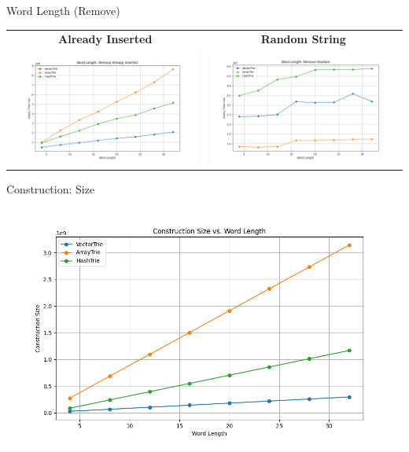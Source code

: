 \documentclass{beamer}
\begin{document}
    \begin{frame}{Word Length (Remove)}
        \begin{center}
            \begin{tabular}{cc}
                \textbf{Already Inserted} & \textbf{Random String} \\
                \includegraphics[width=0.48\linewidth]{plot_word_length/plot_word_length_remove_already_inserted} &
                \includegraphics[width=0.48\linewidth]{plot_word_length/plot_word_length_remove_random} \\
            \end{tabular}
        \end{center}
    \end{frame}


    \begin{frame}{Construction: Size}
        \begin{center}
            \includegraphics[width=\linewidth]{plot_word_length_construction/plot_word_length_construction_size}
        \end{center}
    \end{frame}
\end{document}
